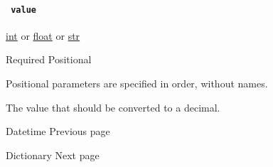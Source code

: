 \paragraph{\texorpdfstring{\texttt{\ value\ }}{ value }}\label{constructor-value}

\href{/docs/reference/foundations/int/}{int} {or}
\href{/docs/reference/foundations/float/}{float} {or}
\href{/docs/reference/foundations/str/}{str}

{Required} {{ Positional }}

\label{constructor-value-positional-tooltip}
Positional parameters are specified in order, without names.

The value that should be converted to a decimal.

\href{/docs/reference/foundations/datetime/}{\pandocbounded{}}

{ Datetime } { Previous page }

\href{/docs/reference/foundations/dictionary/}{\pandocbounded{}}

{ Dictionary } { Next page }
